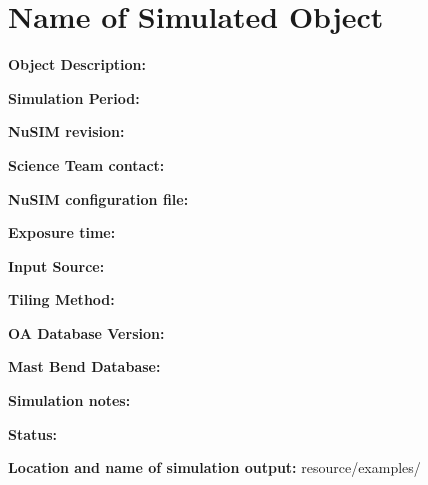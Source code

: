 
\newpage

\section{Name of Simulated Object}

\textbf{Object Description:}

\textbf{Simulation Period:} 

\textbf{NuSIM revision:} %

\textbf{Science Team contact:} 

\textbf{NuSIM configuration file:}

\textbf{Exposure time:}

\textbf{Input Source:} 

\textbf{Tiling Method:}

\textbf{OA Database Version:} 

\textbf{Mast Bend Database:} 

\textbf{Simulation notes:} 

\textbf{Status:} 

\textbf{Location and name of simulation output:} resource/examples/


